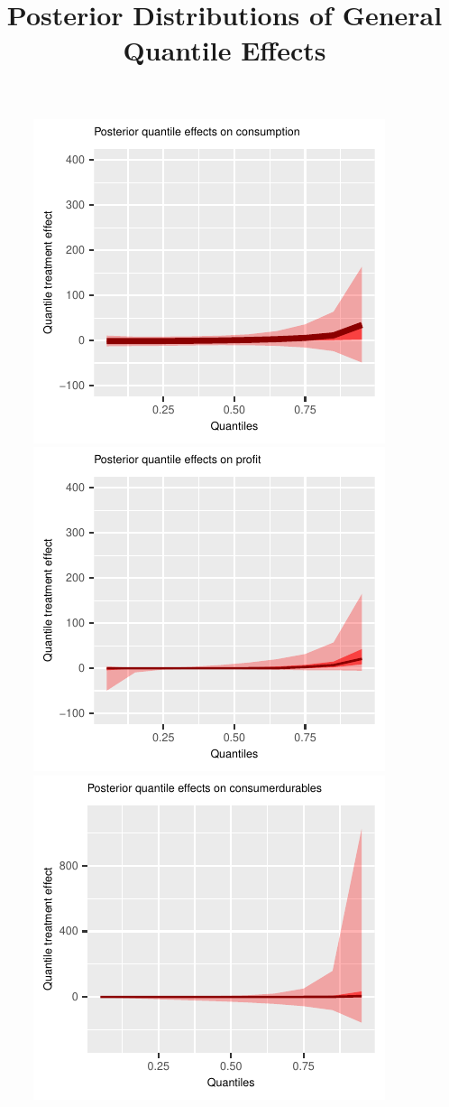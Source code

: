 \documentclass[english,12pt]{article}\usepackage{lmodern}
\numberwithin{equation}{section}
\begin{document}
\clearpage
\newpage







 \begin{figure}[h!]
  \centering
  \title{Posterior Distributions of General Quantile Effects}
    \includegraphics[scale=0.4]{posterior_parent_quantile_TEs_consumption_lognormal.pdf}
        \includegraphics[scale=0.4]{posterior_parent_quantile_TEs_profit_lognormal.pdf}\\
    \includegraphics[scale=0.4]{posterior_parent_quantile_TEs_consumerdurables_lognormal.pdf}

\end{figure}
\end{document}
